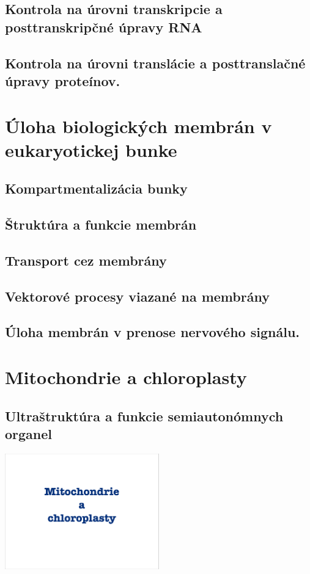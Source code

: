\subsection{Kontrola na úrovni transkripcie a posttranskripčné úpravy RNA}

\subsection{Kontrola na úrovni translácie a posttranslačné úpravy proteínov.}

\section{Úloha biologických membrán v eukaryotickej bunke}

\subsection{Kompartmentalizácia bunky}

\subsection{Štruktúra a funkcie membrán}

\subsection{Transport cez membrány}

\subsection{Vektorové procesy viazané na membrány}

\subsection{Úloha membrán v prenose nervového signálu.}

\section{Mitochondrie a chloroplasty}

\subsection{Ultraštruktúra a funkcie semiautonómnych organel}

\includegraphics[width=0.5\textwidth, page=5]{materials/Bunkova_biologia/prednasky_zaklady_bunkovej_biologie/08_ZBB08-Mitochondrieachloroplasty.pdf}

